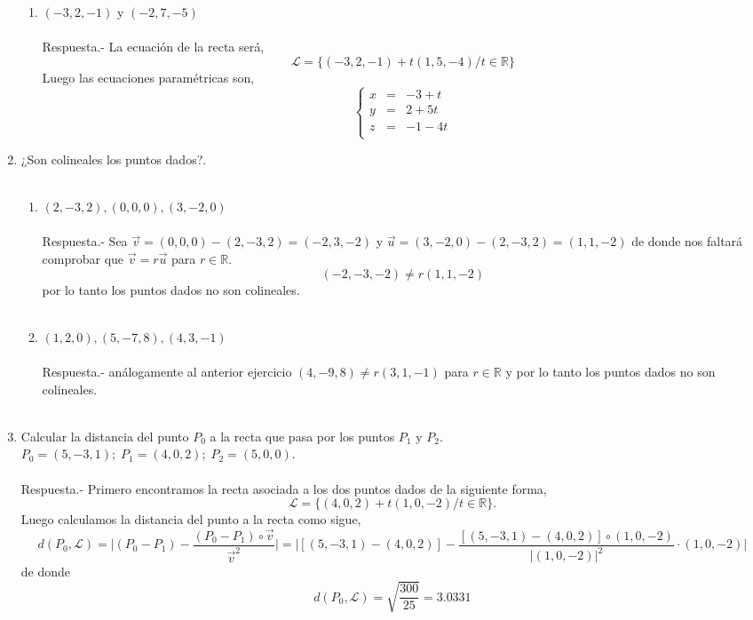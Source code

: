 \begin{enumerate}
\begin{enumerate}[\bfseries a)]
	    \item $(-3,2,-1)$ y $(-2,7,-5)$\\\\
		Respuesta.-\; La ecuación de la recta será,
		$$\mathcal{L} = \lbrace (-3,2,-1) + t(1,5,-4) / t\in \mathbb{R} \rbrace$$
		Luego las ecuaciones paramétricas son, 
		$$\left\{\begin{array}{rcr}
		    x&=&-3+t\\
		    y&=&2+5t\\
		    z&=&-1-4t\\
		\end{array}\right.$$

	\end{enumerate}

    \item ¿Son colineales los puntos dados?.\\\\

	\begin{enumerate}[\bfseries a)]
	    
	    \item $(2,-3,2),(0,0,0),(3,-2,0)$\\\\
		Respuesta.-\; Sea $\vec{v}=(0,0,0)-(2,-3,2)=(-2,3,-2)$ y $\vec{u}=(3,-2,0)-(2,-3,2)=(1,1,-2)$ de donde nos faltará comprobar que $\vec{v}=r\vec{u}$ para $r\in \mathbb{R}$.
		$$(-2,-3,-2)\neq r(1,1,-2)$$
		por lo tanto los puntos dados no son colineales.\\\\

	    \item $(1,2,0),(5,-7,8),(4,3,-1)$\\\\
		Respuesta.-\; análogamente al anterior ejercicio $(4,-9,8)\neq r(3,1,-1)$ para $r\in \mathbb{R}$ y por lo tanto los puntos dados no son colineales.\\\\

	\end{enumerate}

    \item Calcular la distancia del punto $P_0$ a la recta que pasa por los puntos $P_1$ y $P_2$.\\ $P_0 = (5,-3,1); \; P_1=(4,0,2);\; P_2=(5,0,0)$.\\\\
	Respuesta.-\; Primero encontramos la recta asociada a los dos puntos dados de la siguiente forma, $$\mathcal{L} = \lbrace (4,0,2) + t(1,0,-2) / t \in \mathbb{R} \rbrace.$$
	Luego calculamos la distancia del punto a la recta como sigue, 
	$$d(P_0,\mathcal{L}) = \bigg| (P_0 - P_1) - \dfrac{(P_0-P_1)\circ \vec{v}}{\vec{v}^2}\bigg| = \bigg| [(5,-3,1)-(4,0,2)] - \dfrac{\left[(5,-3,1)-(4,0,2)\right]\circ (1,0,-2)}{|(1,0,-2)|^2} \cdot (1,0,-2)\bigg|$$
	    de donde $$d(P_0,\mathcal{L}) = \sqrt{\dfrac{300}{25}} = 3\mbox{.}0331$$\\


\end{enumerate}
